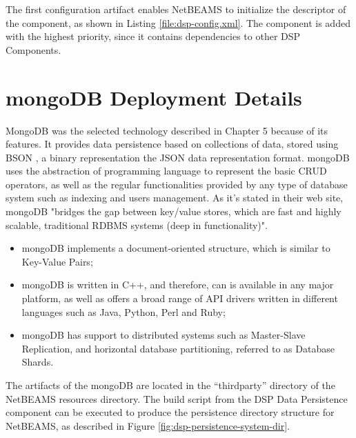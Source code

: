 The first configuration artifact enables NetBEAMS to initialize the
descriptor of the component, as shown in Listing \ref{file:dsp-config.xml}.
The component is added with the highest priority, since it contains
dependencies to other DSP Components.

\section{mongoDB Deployment Details}
\label{sec:mongodb-deployment}

MongoDB was the selected technology described in Chapter 5 because of its
features. It provides data persistence based on collections of data, stored
using BSON \cite{bson}, a binary representation the JSON data representation
format. mongoDB uses the abstraction of programming language to represent the
basic CRUD operators, as well as the regular functionalities provided by any
type of database system such as indexing and users management. As it's stated
in their web site, mongoDB "bridges the gap between key/value stores, which
are fast and highly scalable, traditional RDBMS systems (deep in
functionality)".

\begin{itemize}
  \item mongoDB implements a document-oriented structure, which is similar to
  Key-Value Pairs;
  \item mongoDB is written in C++, and therefore, can is available in any major
  platform, as well as offers a broad range of API drivers written in
  different languages such as Java, Python, Perl and Ruby;
  \item mongoDB has support to distributed systems such as Master-Slave
  Replication, and horizontal database partitioning, referred to as Database
  Shards.
\end{itemize}

The artifacts of the mongoDB are located in the ``thirdparty'' directory of the
NetBEAMS resources directory. The build script from the DSP Data Persistence
component can be executed to produce the persistence directory structure for
NetBEAMS, as described in Figure \ref{fig:dsp-persistence-system-dir}.

